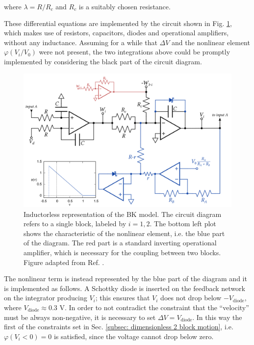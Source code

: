 where $\lambda=R/R_c$ and $R_c$ is a suitably chosen resistance.

These differential equations are implemented by the circuit shown in Fig. \ref{fig: circuit diagram},
which makes use of resistors, capacitors, diodes and operational amplifiers, without any inductance.
Assuming for a while that $\Delta V$ and the nonlinear element $\varphi(V_i/V_0)$ were not present,
the two integrations above could be promptly implemented by considering the black part of the circuit diagram.

\begin{figure}[H]
    \centering
    \includegraphics[width=\linewidth]
    {../1_block/breadboard/breadboard_implementation.png}
    \caption{Inductorless representation of the BK model. The circuit diagram refers to a single block, labeled by $i=1,2$.
    The bottom left plot shows the characteristic of the nonlinear element, i.e. the blue part of the diagram.
    The red part is a standard inverting operational amplifier, which is necessary for the coupling between two blocks.
    Figure adapted from Ref. \cite{ref:electronic_analog}.}
    \label{fig: circuit diagram}
\end{figure}

The nonlinear term is instead represented by the blue part of the diagram and it is implemented as follows.
A Schottky diode is inserted on the feedback network on the integrator producing $V_i$; this ensures that $V_i$ does not
drop below $-V_{\text{diode}}$, where $V_{\text{diode}}\approx 0.3$ V. In order to not contradict the constraint
that the ``velocity'' must be always non-negative, it is necessary to set $\Delta V = V_{\text{diode}}$.
In this way the first of the constraints set in Sec. \ref{subsec: dimensionless 2 block motion}, i.e. $\varphi(V_i < 0 )=0$
is satisfied, since the voltage cannot drop below zero.

